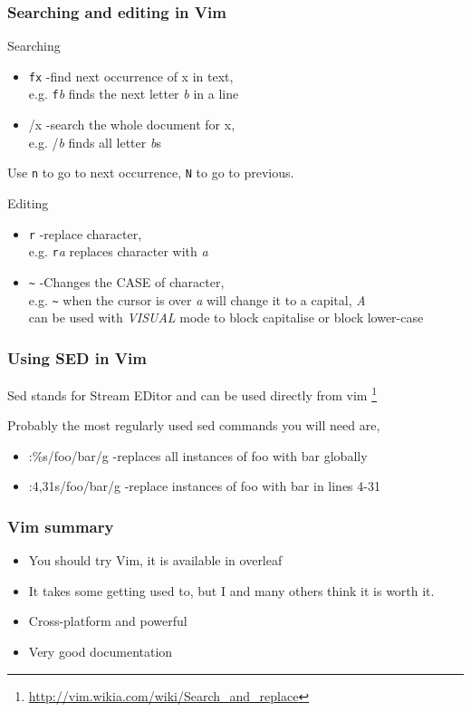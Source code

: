 \documentclass{beamer}
\begin{document}
\begin{frame}
    \frametitle{Searching and editing in Vim}
    Searching
    \begin{itemize}
    \item \texttt{fx} -find next occurrence of x in text,\\ e.g. \texttt{f}\textit{b} finds the next letter \textit{b} in a line 
    \item /x -search the whole document for x,\\ e.g. /\textit{b} finds all letter \textit{b}s
\end{itemize}

Use \texttt{n} to go to next occurrence, \texttt{N} to go to previous.

Editing
\begin{itemize}
        \item \texttt{r} -replace character, \\ e.g. \texttt{r}\textit{a} replaces character with \textit{a}
        \item \texttt{\~} -Changes the CASE of character, \\ e.g. \texttt{\~} when the cursor is over \textit{a} will change it to a capital, \textit{A} \\ can be used with \textit{VISUAL} mode to block capitalise or block lower-case
    \end{itemize}
        \end{frame}

\begin{frame}
    \frametitle{Using SED in Vim}
     Sed stands for Stream EDitor and can be used directly from vim \footnote{\url{http://vim.wikia.com/wiki/Search_and_replace}} 

     Probably the most regularly used sed commands you will need are,
     \begin{itemize}
    \item :\%s/foo/bar/g -replaces all instances of foo with bar globally
    \item :4,31s/foo/bar/g -replace instances of foo with bar in lines 4-31 
\end{itemize}
\end{frame}

\begin{frame}
    \frametitle{Vim summary}
    \begin{itemize}
    \item You should try Vim, it is available in overleaf
    \item It takes some getting used to, but I and many others think it is worth it.
    \item Cross-platform and powerful
    \item Very good documentation
    \end{itemize}
\end{frame}
\end{document}
